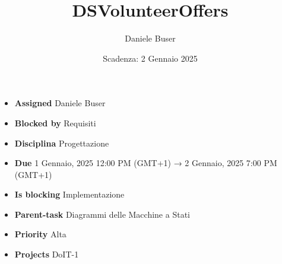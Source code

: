 \title{DSVolunteerOffers}
\author{Daniele Buser}
\date{Scadenza: 2 Gennaio 2025}

\maketitle

\begin{itemize}
    \item \textbf{Assigned} Daniele Buser
    \item \textbf{Blocked by} Requisiti
    \item \textbf{Disciplina} Progettazione
    \item \textbf{Due} 1 Gennaio, 2025 12:00 PM (GMT+1) → 2 Gennaio, 2025 7:00 PM (GMT+1)
    \item \textbf{Is blocking} Implementazione
    \item \textbf{Parent-task} Diagrammi delle Macchine a Stati
    \item \textbf{Priority} Alta
    \item \textbf{Projects} DoIT-1
\end{itemize}